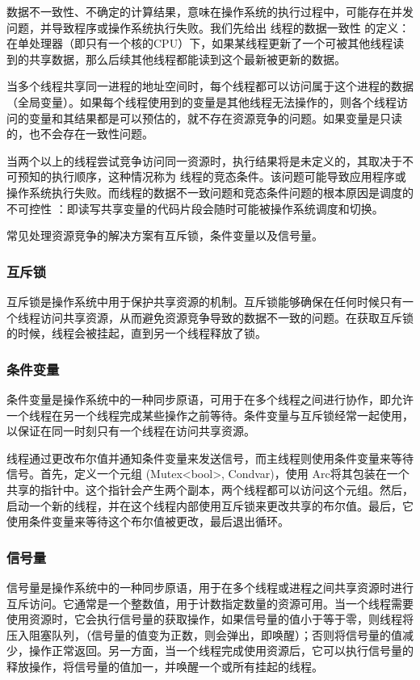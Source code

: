 数据不一致性、不确定的计算结果，意味在操作系统的执行过程中，可能存在并发问题，并导致程序或操作系统执行失败。我们先给出 线程的数据一致性 的定义：在单处理器（即只有一个核的CPU）下，如果某线程更新了一个可被其他线程读到的共享数据，那么后续其他线程都能读到这个最新被更新的数据。

当多个线程共享同一进程的地址空间时，每个线程都可以访问属于这个进程的数据（全局变量）。如果每个线程使用到的变量是其他线程无法操作的，则各个线程访问的变量和其结果都是可以预估的，就不存在资源竞争的问题。如果变量是只读的，也不会存在一致性问题。

当两个以上的线程尝试竞争访问同一资源时，执行结果将是未定义的，其取决于不可预知的执行顺序，这种情况称为 线程的竞态条件。该问题可能导致应用程序或操作系统执行失败。而线程的数据不一致问题和竞态条件问题的根本原因是调度的不可控性 ：即读写共享变量的代码片段会随时可能被操作系统调度和切换。

常见处理资源竞争的解决方案有互斥锁，条件变量以及信号量。

\subsubsection{互斥锁}

互斥锁是操作系统中用于保护共享资源的机制。互斥锁能够确保在任何时候只有一个线程访问共享资源，从而避免资源竞争导致的数据不一致的问题。在获取互斥锁的时候，线程会被挂起，直到另一个线程释放了锁。

\subsubsection{条件变量}

条件变量是操作系统中的一种同步原语，可用于在多个线程之间进行协作，即允许一个线程在另一个线程完成某些操作之前等待。条件变量与互斥锁经常一起使用，以保证在同一时刻只有一个线程在访问共享资源。

线程通过更改布尔值并通知条件变量来发送信号，而主线程则使用条件变量来等待信号。首先，定义一个元组 (Mutex<bool>, Condvar)，使用 Arc将其包装在一个共享的指针中。这个指针会产生两个副本，两个线程都可以访问这个元组。然后，启动一个新的线程，并在这个线程内部使用互斥锁来更改共享的布尔值。最后，它使用条件变量来等待这个布尔值被更改，最后退出循环。

\subsubsection{信号量}

信号量是操作系统中的一种同步原语，用于在多个线程或进程之间共享资源时进行互斥访问。它通常是一个整数值，用于计数指定数量的资源可用。当一个线程需要使用资源时，它会执行信号量的获取操作，如果信号量的值小于等于零，则线程将压入阻塞队列，（信号量的值变为正数，则会弹出，即唤醒）；否则将信号量的值减少，操作正常返回。另一方面，当一个线程完成使用资源后，它可以执行信号量的释放操作，将信号量的值加一，并唤醒一个或所有挂起的线程。

